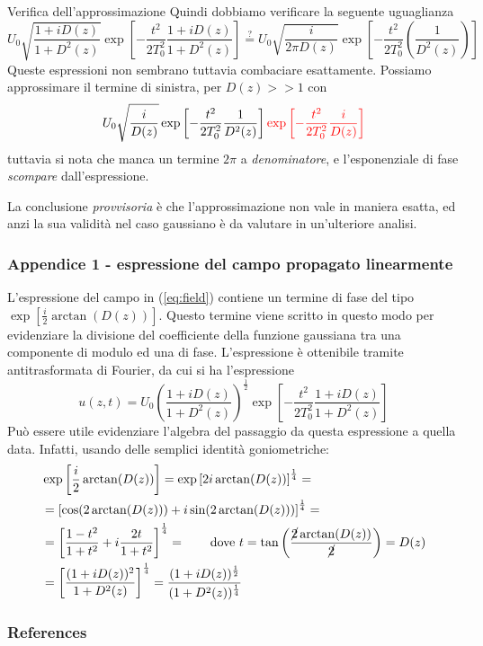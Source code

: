 \documentclass[8pt]{beamer} %
\begin{document}
\begin{frame}{Verifica dell'approssimazione}
    Quindi dobbiamo verificare la seguente uguaglianza
    \begin{equation}
        U_0 \sqrt{\dfrac{1+iD(z)}{1+D^2(z)}} \exp\left[-\dfrac{t^2}{2T_0^2} \dfrac{1+iD(z)}{1+D^2(z)}\right]  \stackrel{?}{=}  U_0 \sqrt{\frac{i}{2\pi D(z)}} \exp\left[-\dfrac{t^2}{2T_0^2} \left(\dfrac{1}{D^2(z)}\right)\right]
    \end{equation}
    Queste espressioni non sembrano tuttavia combaciare esattamente. Possiamo approssimare il termine di sinistra, per $D(z)>>1$ con
    \begin{equation}
        U_0 \sqrt{\dfrac{i}{D(z)}} \exp\left[-\dfrac{t^2}{2T_0^2} \dfrac{1}{D^2(z)}\right] {\color{red} \exp\left[-\dfrac{t^2}{2T_0^2} \dfrac{i}{D(z)}\right]}
    \end{equation}
    tuttavia si nota che manca un termine $2\pi$ a \textit{denominatore}, e l'esponenziale di fase \textit{scompare} dall'espressione.

    \vspace{20pt}
    La conclusione \textit{provvisoria} è che l'approssimazione non vale in maniera esatta, ed anzi la sua validità nel caso gaussiano è da valutare in un'ulteriore analisi.
\end{frame}

\begin{frame}[plain]
    \frametitle{Appendice 1 - espressione del campo propagato linearmente}
    L'espressione del campo in (\ref{eq:field}) contiene un termine di fase del tipo $\exp\left[\frac{i}{2} \arctan(D(z)) \right]$. Questo termine viene scritto in questo modo per evidenziare la divisione del coefficiente della funzione gaussiana tra una componente di modulo ed una di fase. L'espressione è ottenibile tramite antitrasformata di Fourier, da cui si ha l'espressione
    \begin{equation}
        u(z, t) = U_0 \left(\dfrac{1+iD(z)}{1+D^2(z)}\right)^{\frac{1}{2}} \exp\left[-\dfrac{t^2}{2T_0^2} \dfrac{1+iD(z)}{1+D^2(z)}\right]
    \end{equation}
    Può essere utile evidenziare l'algebra del passaggio da questa espressione a quella data. Infatti, usando delle semplici identità goniometriche:
    \begin{align*}
         & \exp\left[ \dfrac{i}{2} \arctan(D(z))\right] = \exp\left[ 2i \arctan(D(z))\right]^{\frac{1}{4}}=                                                                      \\
         & =\left[\cos(2\arctan(D(z))) + i \sin(2\arctan(D(z)))\right]^{\frac{1}{4}}=                                                                                            \\
         & =\left[\dfrac{1-t^2}{1+t^2} + i \dfrac{2t}{1+t^2}\right]^{\frac{1}{4}}  =  \qquad \text{dove $t=\tan\left(\dfrac{\cancel{2}\arctan(D(z))}{\cancel{2}}\right) = D(z)$} \\
         & = \left[\dfrac{(1+iD(z))^2}{1+D^2(z)}\right]^{\frac{1}{4}} = \dfrac{(1+iD(z))^{\frac{1}{2}}}{(1+D^2(z))^{\frac{1}{4}}}
    \end{align*}
\end{frame}


\begin{frame}
    \frametitle{References}
    \printbibliography
\end{frame}
\end{document}

